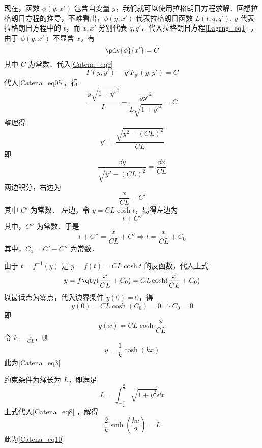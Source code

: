现在，函数 $\phi(y,x')$ 包含自变量 $y$，我们就可以使用拉格朗日方程求解．回想拉格朗日方程的推导，不难看出，$\phi(y,x')$ 代表拉格朗日函数 $L(t,q,q')$, $y$ 代表拉格朗日方程中的 $t$，而 $x,x'$ 分别代表 $q,q'$．代入拉格朗日方程\autoref{Lagrng_eq1}~，由于 $\phi(y,x')$ 不显含 $x$，有
\begin{equation}
\pdv{\phi}{x'}=C
\end{equation}
其中 $C$ 为常数．代入\autoref{Catena_eq9} 
\begin{equation}
F(y,y')-y'F_{y'}(y,y')=C
\end{equation}
代入\autoref{Catena_eq05}，得
\begin{equation}
\frac{y\sqrt{1+y'^2}}{L}-\frac{yy'^2}{L\sqrt{1+y'^2}}=C
\end{equation}
整理得
\begin{equation}
y'=\frac{\sqrt{y^2-(CL)^2}}{CL}
\end{equation}
即
\begin{equation}
\frac{\dd y}{\sqrt{y^2-(CL)^2}}=\frac{\dd x}{CL}
\end{equation}
两边积分，右边为
\begin{equation}
\frac{x}{CL}+C'
\end{equation}
其中 $C'$ 为常数．
左边，令 $y=CL\cosh t $，易得左边为
\begin{equation}
t+C''
\end{equation}
其中，$C''$ 为常数．于是
\begin{equation}
t+C''=\frac{x}{CL}+C'\Rightarrow t=\frac{x}{CL}+C_0
\end{equation}
其中，$C_0=C'-C''$ 为常数．

由于 $t=f^{-1}(y)$ 是 $y=f(t)=CL\cosh t$ 的反函数，代入上式
\begin{equation}\label{Catena_eq13}
y=f\qty(\frac{x}{CL}+C_0)=CL\cosh (\frac{x}{CL}+C_0)
\end{equation}
以最低点为零点，代入边界条件 $y(0)=0$，得
\begin{equation}
y(0)=CL\cosh (C_0)=0\Rightarrow C_0=0
\end{equation}
即
\begin{equation}
y(x)=CL \cosh \frac{x}{CL}
\end{equation}
令 $k=\frac{1}{CL}$，则
\begin{equation}\label{Catena_eq8}
y=\frac{1}{k}\cosh (kx)
\end{equation}
此为\autoref{Catena_eq3} 

约束条件为绳长为 $L$，即满足
\begin{equation}
L = \int_{-\frac{a}{2}}^{\frac{a}{2}} \sqrt{1 + \dot y^2} \dd{x}
\end{equation}
上式代入\autoref{Catena_eq8} ，解得
\begin{equation}
\frac{2}{k}\sinh(\frac{ka}{2}) = L
\end{equation}
此为\autoref{Catena_eq10} 

